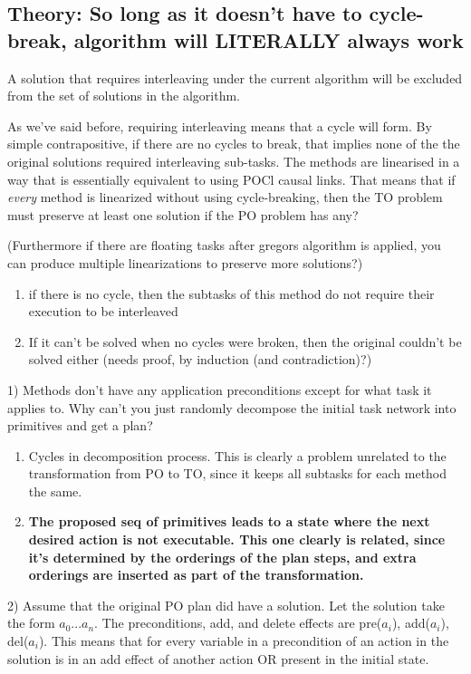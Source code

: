 \subsection{Theory: So long as it doesn't have to cycle-break, algorithm will LITERALLY always work}
	 A solution that requires interleaving under the current algorithm 
	will be excluded from the set of solutions in the algorithm.
	
	As we've said before, requiring interleaving means that a cycle will form.
	By simple contrapositive, if there are no cycles to break, that implies none of the the original solutions required interleaving sub-tasks.
	The methods are linearised in a way that is essentially equivalent to using POCl causal links. That means that if \emph{every} method is linearized without using cycle-breaking, then the TO problem must preserve at least one solution if the PO problem has any?
	
	(Furthermore if there are floating tasks after gregors algorithm is applied, you can produce multiple linearizations to preserve more solutions?)
	
	\begin{enumerate}
		\item if there is no cycle, then the subtasks of this method do not require their execution to be interleaved  
		\item If it can't be solved when no cycles were broken, then the original couldn't be solved either (needs proof, by induction (and contradiction)?)		
	\end{enumerate}



	1) Methods don't have any application preconditions except for what task it applies to.
	Why can't you just randomly decompose the initial task network into primitives and get a plan?
	\begin{enumerate}
		\item Cycles in decomposition process. This is clearly a problem unrelated to the transformation from PO to TO,
		since it keeps all subtasks for each method the same. 
		\item \textbf{The proposed seq of primitives leads to a state where the next desired action is not executable. This one clearly is related, since
			it's determined by the orderings of the plan steps, and	extra orderings are inserted as part of the transformation.} 
	\end{enumerate}

	
	2) Assume that the original PO plan did have a solution. Let the solution take the form $a_0 ... a_n$. The preconditions, add, and delete effects are pre($a_i$), add($a_i$), del($a_i$).	This means that for every variable in a precondition of an action in the solution is in an add effect of another action OR present in the initial state.
	

